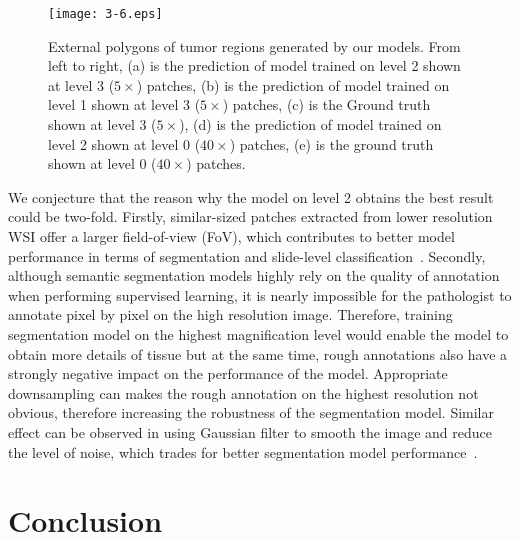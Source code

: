 \begin{figure}[!h]
\centering
\texttt{[image: 3-6.eps]}
\caption{External polygons of tumor regions generated by our models. From left to right, (a) is the prediction of model trained on level 2 shown at level 3 ($5\times$) patches, (b) is the prediction of model trained on level 1 shown at level 3 ($5\times$) patches, (c) is the Ground truth shown at level 3 ($5\times$), (d) is the prediction of model trained on level 2 shown at level 0 ($40\times$) patches, (e) is the ground truth shown at level 0 ($40\times$) patches.} 
\label{fig:3-6}
\end{figure}

We conjecture that the reason why the model on level 2 obtains the best result could be two-fold. Firstly, similar-sized patches extracted from lower resolution WSI offer a larger field-of-view (FoV), which contributes to better model performance in terms of segmentation and slide-level classification~\cite{Guo2019}. Secondly, although semantic segmentation models highly rely on the quality of annotation when performing supervised learning, it is nearly impossible for the pathologist to annotate pixel by pixel on the high resolution image. Therefore, training segmentation model on the highest magnification level would enable the model to obtain more details of tissue but at the same time, rough annotations also have a strongly negative impact on the performance of the model. Appropriate downsampling can makes the rough annotation on the highest resolution not obvious, therefore increasing the robustness of the segmentation model. Similar effect can be observed in using Gaussian filter to smooth the image and reduce the level of noise, which trades for better segmentation model performance~\cite{cai2017framework,nasor2021segmentation}. 

\section{Conclusion}\label{se:3-5}

